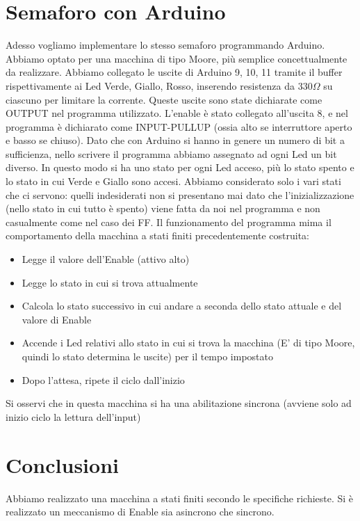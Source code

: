 \documentclass[10pt,a4paper]{article}
\begin{document}
\section{Semaforo con Arduino}
Adesso vogliamo implementare lo stesso semaforo programmando Arduino. Abbiamo optato per una macchina di tipo Moore, più semplice concettualmente da realizzare.
Abbiamo collegato le uscite di Arduino 9, 10, 11 tramite il buffer rispettivamente ai Led Verde, Giallo, Rosso, inserendo resistenza da $330\Omega$ su ciascuno per limitare la corrente.
Queste uscite sono state dichiarate come OUTPUT nel programma utilizzato.
L'enable è stato collegato all'uscita 8, e nel programma è dichiarato come INPUT-PULLUP (ossia alto se interruttore aperto e basso se chiuso).
Dato che con Arduino si hanno in genere un numero di bit a sufficienza, nello scrivere il programma abbiamo assegnato ad ogni Led un bit diverso. In questo modo si ha uno stato per ogni Led acceso, più lo stato spento e lo stato in cui Verde e Giallo sono accesi. Abbiamo considerato solo i vari stati che ci servono: quelli indesiderati non si presentano mai dato che l'inizializzazione (nello stato in cui tutto è spento) viene fatta da noi nel programma e non casualmente come nel caso dei FF.
Il funzionamento del programma mima il comportamento della macchina a stati finiti precedentemente costruita:
\begin{itemize}
\item Legge il valore dell'Enable (attivo alto)
\item Legge lo stato in cui si trova attualmente
\item Calcola lo stato successivo in cui andare a seconda dello stato attuale e del valore di Enable
\item Accende i Led relativi allo stato in cui si trova la macchina (E' di tipo Moore, quindi lo stato determina le uscite) per il tempo impostato
\item Dopo l'attesa, ripete il ciclo dall'inizio
\end{itemize}
Si osservi che in questa macchina si ha una abilitazione sincrona (avviene solo ad inizio ciclo la lettura dell'input)
\section{Conclusioni}
Abbiamo realizzato una macchina a stati finiti secondo le specifiche richieste.
Si è realizzato un meccanismo di Enable sia asincrono che sincrono.
\end{document}
